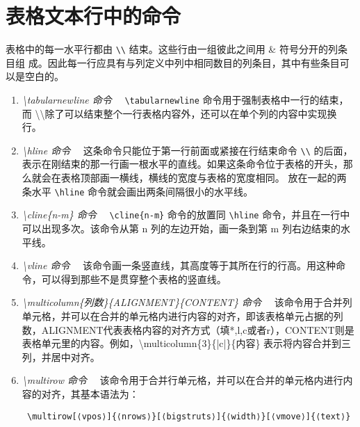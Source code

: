 \section{表格文本行中的命令}
表格中的每一水平行都由 \verb|\\| 结束。这些行由一组彼此之间用 \& 符号分开的列条目组
成。因此每一行应具有与列定义中列中相同数目的列条目，其中有些条目可以是空白的。
\begin{enumerate}
    \item \emph{ \backslash tabularnewline 命令}~~ \verb|\tabularnewline| 命令用于强制表格中一行的结束，而 \backslash\backslash 除了可以结束整个一行表格内容外，还可以在单个列的内容中实现换行。
    \item \emph{ \backslash hline 命令}~~ 这条命令只能位于第一行前面或紧接在行结束命令 \verb|\\| 的后面，表示在刚结束的那一行画一根水平的直线。如果这条命令位于表格的开头，那么就会在表格顶部画一横线，横线的宽度与表格的宽度相同。 放在一起的两条水平 \verb|\hline| 命令就会画出两条间隔很小的水平线。
    \item \emph{ \backslash cline\{n-m\}  命令}~~ \verb|\cline{n-m}| 命令的放置同 \verb|\hline| 命令，并且在一行中可以出现多次。该命令从第 n 列的左边开始，画一条到第 m 列右边结束的水平线。
    \item \emph{ \backslash vline 命令}~~ 该命令画一条竖直线，其高度等于其所在行的行高。用这种命令，可以得到那些不是贯穿整个表格的竖直线。
    \item \emph{ \backslash multicolumn\{列数\}\{ALIGNMENT\}\{CONTENT\} 命令}~~ 该命令用于合并列单元格，并可以在合并的单元格内进行内容的对齐，即该表格单元占据的列数，ALIGNMENT代表表格内容的对齐方式（填*,l,c或者r），CONTENT则是表格单元里的内容。例如，\backslash multicolumn\{3\}\{|c|\}\{内容\} 表示将内容合并到三列，并居中对齐。
    \item \emph{ \backslash multirow 命令}~~ 该命令用于合并行单元格，并可以在合并的单元格内进行内容的对齐，其基本语法为：
    \begin{verbatim} \multirow[⟨vpos⟩]{⟨nrows⟩}[⟨bigstruts⟩]{⟨width⟩}[⟨vmove⟩]{⟨text⟩} \end{verbatim}
    

\end{enumerate}
